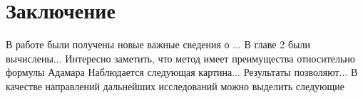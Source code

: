 \chapter*{Заключение}                       %


В работе были получены новые важные сведения о ...
В главе 2 были вычислены... Интересно заметить, что метод имеет преимущества относительно формулы Адамара
Наблюдается следующая картина... Результаты позволяют...
В качестве направлений дальнейших исследований можно выделить следующие

